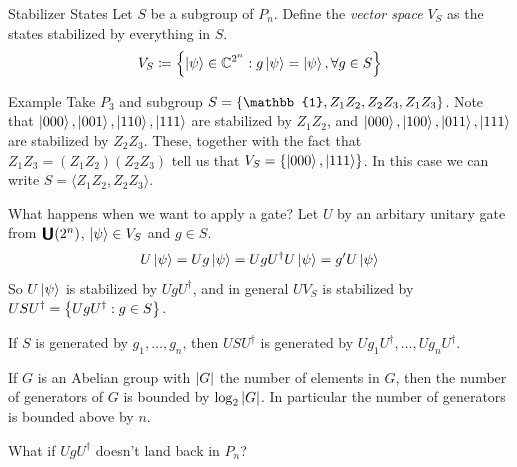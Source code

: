 \documentclass[11pt,aspectratio=1610]{beamer}
\newcommand{\unitary}[1]{\raisebox{-1pt}{\scalebox{1.2}{$\bm{\mathsf{U}}$}}\qty(#1)}
\begin{document}
\begin{frame}{Stabilizer States}
	Let $S$ be a subgroup of $P_n$. Define the \emph{vector space} $V_S$ as the states stabilized by everything in $S$.
	\begin{equation*}
		V_S\coloneqq \qty{\ket{\psi}\in\mathbb{C}^{2^n}: g\ket{\psi} = \ket{\psi}, \forall g\in S}
	\end{equation*}
	\begin{exampleblock}{Example}
		Take $P_3$ and subgroup $S = \qty{\mathbb{1}, Z_1Z_2, Z_2Z_3, Z_1Z_3}$. Note that $\ket{000}, \ket{001}, \ket{110}, \ket{111}$ are stabilized by $Z_1Z_2$, and $\ket{000}, \ket{100}, \ket{011}, \ket{111}$ are stabilized by $Z_2Z_3$. These, together with the fact that $Z_1Z_3 = (Z_1Z_2)(Z_2Z_3)$ tell us that $V_S = \qty{\ket{000}, \ket{111}}$. In this case we can write $S = \langle Z_1Z_2, Z_2Z_3\rangle$.
	\end{exampleblock}
\end{frame}

\begin{frame}[t]{What happens when we want to apply a gate?}
	Let $U$ by an arbitary unitary gate from $\unitary{2^n}$, $\ket{\psi}\in V_S$ and $g\in S$.\pause
	\begin{equation*}
		U\ket{\psi} = Ug\ket{\psi} = UgU^\dagger U\ket{\psi} = g'U\ket{\psi}
	\end{equation*}\pause
	So $U\ket{\psi}$ is stabilized by $UgU^\dagger$, and in general $UV_S$ is stabilized by $USU^\dagger = \qty{UgU^\dagger : g\in S}$.

	\begin{corollary}
		If $S$ is generated by $g_1,\ldots, g_n$, then $USU^\dagger$ is generated by $Ug_1U^\dagger,\ldots, Ug_nU^\dagger$.
	\end{corollary}\pause

	If $G$ is an Abelian group with $\abs{G}$ the number of elements in $G$, then the number of generators of $G$ is bounded by $\log_2\abs{G}$. In particular the number of generators is bounded above by $n$.\pause

	\begin{warning}
		\begin{center}
			What if $UgU^\dagger$ doesn't land back in $P_n$?
		\end{center}
	\end{warning}
\end{frame}
\end{document}
